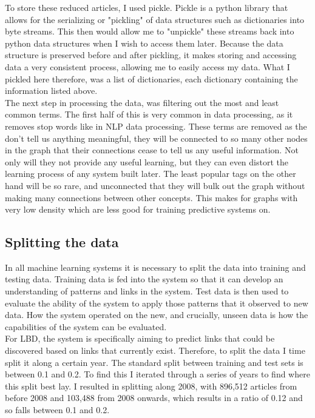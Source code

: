 \documentclass{l4proj}
\begin{document}
To store these reduced articles, I used pickle. Pickle is a python library that allows for the serializing or "pickling" of data structures such as dictionaries into byte streams. This then would allow me to "unpickle" these streams back into python data structures when I wish to access them later. Because the data structure is preserved before and after pickling, it makes storing and accessing data a very consistent process, allowing me to easily access my data. What I pickled here therefore, was a list of dictionaries, each dictionary containing the information listed above.\\

The next step in processing the data, was filtering out the most and least common terms. The first half of this is very common in data processing, as it removes stop words like in NLP data processing. These terms are removed as the don't tell us anything meaningful, they will be connected to so many other nodes in the graph that their connections cease to tell us any useful information. Not only will they not provide any useful learning, but they can even distort the learning process of any system built later. The least popular tags on the other hand will be so rare, and unconnected that they will bulk out the graph without making many connections between other concepts. This makes for graphs with very low density which are less good for training predictive systems on.\\

\subsection{Splitting the data}

In all machine learning systems it is necessary to split the data into training and testing data. Training data is fed into the system so that it can develop an understanding of patterns and links in the system. Test data is then used to evaluate the ability of the system to apply those patterns that it observed to new data. How the system operated on the new, and crucially, unseen data is how the capabilities of the system can be evaluated. \\

For LBD, the system is specifically aiming to predict links that could be discovered based on links that currently exist. Therefore, to split the data I time split it along a certain year. The standard split between training and test sets is between 0.1 and 0.2. To find this I iterated through a series of years to find where this split best lay. I resulted in splitting along 2008, with 896,512 articles from before 2008 and 103,488 from 2008 onwards, which results in a ratio of 0.12 and so falls between 0.1 and 0.2. \\
\end{document}
